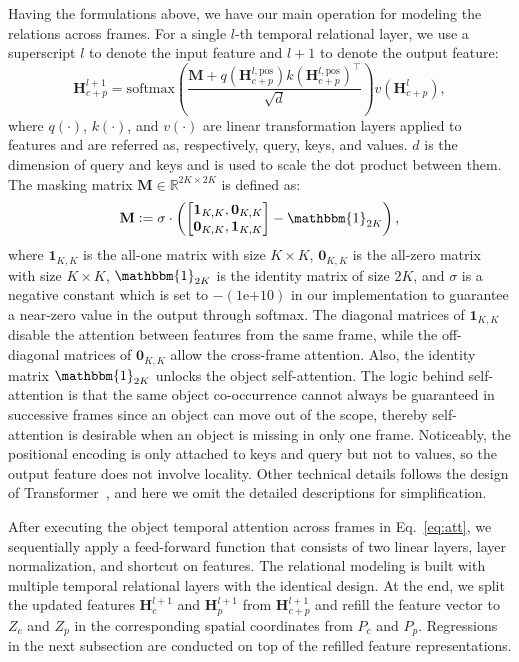 \documentclass[10pt,twocolumn,letterpaper]{article}
\newcommand{\RR}{\mathbb{R}}
\newcommand{\defeq}{\vcentcolon=}
\begin{document}
Having the formulations above, we have our main operation for modeling the relations across frames. For a single $l$-th temporal relational layer, we use a superscript $l$ to denote the input feature and $l+1$ to denote the output feature:
\begin{equation}\label{eq:att}
    \textbf{H}_{c+p}^{l+1} = \text{softmax}\left(\frac{\textbf{M} + q(\textbf{H}_{c+p}^{l, \text{pos}}) k(\textbf{H}_{c+p}^{l, \text{pos}})^\top}{\sqrt{d}}\right)v(\textbf{H}_{c+p}^{l}),
\end{equation}
where $q(\cdot)$, $k(\cdot)$, and $v(\cdot)$ are linear transformation layers applied to features and are referred as, respectively, query, keys, and values. $d$ is the dimension of query and keys and is used to scale the dot product between them. The masking matrix $\textbf{M}\in\RR^{2K\times 2K}$ is defined as:
\begin{equation}
    \textbf{M} \defeq \sigma\cdot \left(\begin{bmatrix} \textbf{1}_{K,K}, \textbf{0}_{K,K}\\ \textbf{0}_{K,K}, \textbf{1}_{K,K}\\\end{bmatrix} - \mathbbm{1}_{2K} \right),
\end{equation}
where $\textbf{1}_{K,K}$ is the all-one matrix with size $K\times K$, $\textbf{0}_{K,K}$ is the all-zero matrix with size $K\times K$, $\mathbbm{1}_{2K}$ is the identity matrix of size $2K$, and $\sigma$ is a negative constant which is set to $-(1\mathrm{e}{+10})$ in our implementation to guarantee a near-zero value in the output through softmax. The diagonal matrices of $\textbf{1}_{K,K}$ disable the attention between features from the same frame, while the off-diagonal matrices of $\textbf{0}_{K,K}$ allow the cross-frame attention. Also, the identity matrix $\mathbbm{1}_{2K}$ unlocks the object self-attention. The logic behind self-attention is that the same object co-occurrence cannot always be guaranteed in successive frames since an object can move out of the scope, thereby self-attention is desirable when an object is missing in only one frame. Noticeably, the positional encoding is only attached to keys and query but not to values, so the output feature does not involve locality. Other technical details follows the design of Transformer~\cite{vaswani2017attention}, and here we omit the detailed descriptions for simplification.

After executing the object temporal attention across frames in Eq.~\eqref{eq:att}, we sequentially apply a feed-forward function that consists of two linear layers, layer normalization, and shortcut on features. The relational modeling is built with multiple temporal relational layers with the identical design. At the end, we split the updated features $\textbf{H}_{c}^{l+1}$ and $\textbf{H}_{p}^{l+1}$ from $\textbf{H}_{c+p}^{l+1}$ and refill the feature vector to $Z_c$ and $Z_p$ in the corresponding spatial coordinates from $P_c$ and $P_p$. Regressions in the next subsection are conducted on top of the refilled feature representations.
\end{document}
